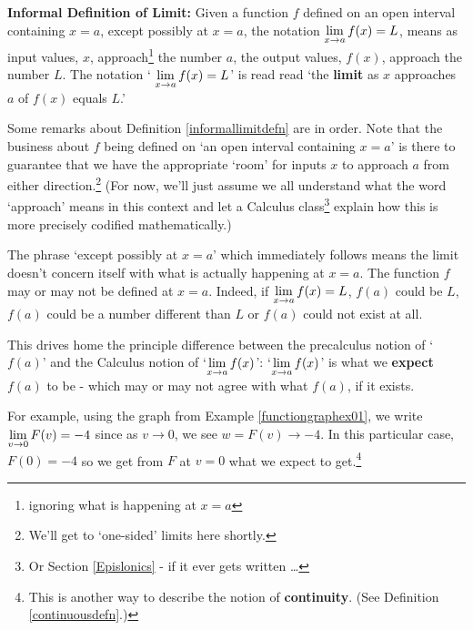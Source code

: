 \medskip

\colorbox{ResultColor}{\bbm

\begin{defn} \label{informallimitdefn} \textbf{Informal Definition of Limit:}  Given a function $f$ defined on an open interval containing $x=a$, except possibly at $x=a$, the notation $\displaystyle{\lim_{x \rightarrow a} f(x) = L}$, means as input values, $x$, approach\footnote{ignoring what is happening at $x=a$} the number $a$, the output values, $f(x)$, approach the number $L$.  The notation ` $\displaystyle{\lim_{x \rightarrow a} f(x) = L}$'  is read read `the \textbf{limit} as $x$ approaches $a$ of $f(x)$ equals $L$.' 
\end{defn}

\ebm}


\medskip


Some remarks about Definition \ref{informallimitdefn} are in order.  Note that the business about $f$ being defined on `an open interval containing $x=a$'  is there to guarantee that we have the appropriate `room' for inputs $x$ to approach $a$ from either direction.\footnote{We'll get to `one-sided' limits here shortly.}  (For now, we'll just assume we all understand what the word `approach' means in this context and let a Calculus class\footnote{Or Section \ref{Epislonics} - if it ever gets written \ldots} explain how this is more precisely codified mathematically.)

\medskip 

The phrase  `except possibly at $x=a$' which immediately follows means the limit doesn't concern itself with what is actually happening at $x=a$.  The function  $f$ may or may not be defined at $x = a$.  Indeed,  if  $\displaystyle{\lim_{x \rightarrow a} f(x) = L}$, $f(a)$ could be $L$, $f(a)$  could be a number different than $L$ or $f(a)$ could not exist at all.  

\medskip

 This drives home the principle difference between the precalculus notion of `$f(a)$' and the Calculus notion of  `$\displaystyle{\lim_{x \rightarrow a} f(x)}$':  `$\displaystyle{\lim_{x \rightarrow a} f(x)}$' is what we \textbf{expect} $f(a)$ to be - which may or may not agree with what $f(a)$, if it exists. 

\medskip

For example, using the graph from Example \ref{functiongraphex01}, we write $\displaystyle{\lim_{v \rightarrow 0} F(v) = -4}$ since as $v \rightarrow 0$, we see $w = F(v) \rightarrow -4$.  In this particular case, $F(0) = -4$ so we get from $F$ at $v=0$ what we expect to get.\footnote{This is another way to describe the notion of \textbf{continuity}.  (See Definition \ref{continuousdefn}.)}

